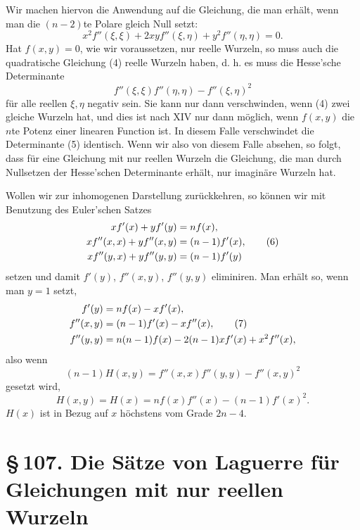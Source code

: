 \documentclass[11pt]{article}
\providecommand{\sect}[2]{\section*{\S\,#1. #2}}
\begin{document}
Wir machen hiervon die Anwendung auf die Gleichung, die man erhält, wenn man die $(n-2)$te Polare gleich Null setzt:
\begin{equation}
        x^2f''(\xi,\xi)+2xyf''(\xi,\eta)+y^2f''(\eta,\eta)=0.
\tag{4}
\end{equation}
Hat $f(x,y)=0$, wie wir voraussetzen, nur reelle Wurzeln, so muss auch die quadratische Gleichung (4) reelle Wurzeln haben, d. h. es muss die Hesse'sche Determinante
\begin{equation}
        f''(\xi,\xi)f''(\eta,\eta)-f''(\xi,\eta)^2
\tag{5}
\end{equation}
für alle reellen $\xi,\eta$ negativ sein. Sie kann nur dann verschwinden, wenn (4) zwei gleiche Wurzeln hat, und dies ist nach XIV nur dann möglich, wenn $f(x,y)$ die $n$te Potenz einer linearen Function ist. In diesem Falle verschwindet die Determinante (5) identisch. Wenn wir also von diesem Falle absehen, so folgt, dass für eine Gleichung mit nur reellen Wurzeln die Gleichung, die man durch Nullsetzen der Hesse'schen Determinante erhält, nur imaginäre Wurzeln hat.

Wollen wir zur inhomogenen Darstellung zurückkehren, so können wir mit Benutzung des Euler'schen Satzes
\begin{align}
        xf'(x)+yf'(y)&=nf(x),\notag\\
        xf''(x,x)+yf''(x,y)&=(n-1)f'(x),\tag{6}\\
        xf''(y,x)+yf''(y,y)&=(n-1)f'(y)\notag
\end{align}
setzen und damit $f'(y)$, $f''(x,y)$, $f''(y,y)$ eliminiren. Man erhält so, wenn man $y=1$ setzt,
\begin{align}
        f'(y)&=nf(x)-xf'(x),\notag\\
        f''(x,y)&=(n-1)f'(x)-xf''(x),\tag{7}\\
        f''(y,y)&=n(n-1)f(x)-2(n-1)xf'(x)+x^2f''(x),
\notag
\end{align}
also wenn
\begin{equation}
        (n-1)H(x,y)=f''(x,x)f''(y,y)-f''(x,y)^2
\tag{8}
\end{equation}
gesetzt wird,
\begin{equation}
        H(x,y)=H(x)=n f(x)f''(x)-(n-1)f'(x)^2.
\tag{9}
\end{equation}
$H(x)$ ist in Bezug auf $x$ höchstens vom Grade $2n-4$.

\sect{107}{Die Sätze von Laguerre für Gleichungen mit nur reellen Wurzeln}
\end{document}
